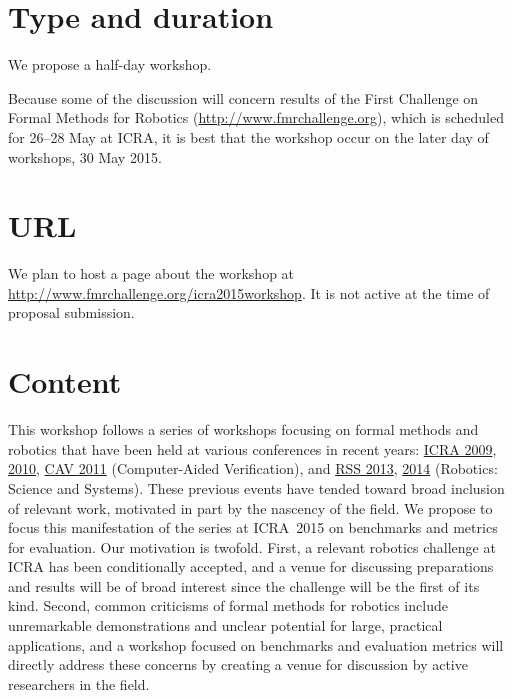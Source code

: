 \documentclass{amsart}
\begin{document}
\section{Type and duration}

We propose a half-day workshop.

Because some of the discussion will concern results of the First Challenge on
Formal Methods for Robotics (\url{http://www.fmrchallenge.org}), which is
scheduled for 26--28 May at ICRA, it is best that the workshop occur on the
later day of workshops, 30 May 2015.

\section{URL}

We plan to host a page about the workshop at \url{http://www.fmrchallenge.org/icra2015workshop}.   It is not active at the time of proposal submission.


\section{Content}

This workshop follows a series of workshops focusing on formal methods and
robotics that have been held at various conferences in recent years:
\href{http://verifiablerobotics.com/ICRA09/index.html}{ICRA 2009},
\href{http://verifiablerobotics.com/ICRA10/index.html}{2010},
\href{http://verifiablerobotics.com/CAV11/index.html}{CAV 2011} (Computer-Aided
Verification), and \href{http://verifiablerobotics.com/RSS13/index.html}{RSS
  2013}, \href{http://verifiablerobotics.com/RSS14/index.html}{2014} (Robotics:
Science and Systems).  These previous events have tended toward broad inclusion
of relevant work, motivated in part by the nascency of the field.  We propose to
focus this manifestation of the series at ICRA~2015 on benchmarks and metrics for evaluation.
Our motivation is twofold.  First, a relevant robotics challenge at ICRA has
been conditionally accepted, and a venue for discussing preparations and results
will be of broad interest since the challenge will be the first of its kind.
Second, common criticisms of formal methods for robotics include unremarkable
demonstrations and unclear potential for large, practical applications, and a
workshop focused on benchmarks and evaluation metrics will directly address these concerns
by creating a venue for discussion by active researchers in the field.
\end{document}
